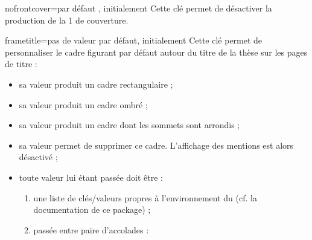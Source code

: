 \begin{docKey}{nofrontcover}{=\textbar{}}{par défaut
    , initialement }%
  Cette clé permet de désactiver la production de la 1\iere{} de couverture.
\end{docKey}

{%
\begin{docKey}{frametitle}{=\textbar{}\textbar{}\textbar{}\textbar{}}{pas de valeur par défaut, initialement }
  Cette clé permet de personnaliser le cadre figurant par défaut autour du
  titre de la thèse sur les pages de titre :
  \begin{itemize}
  \item sa valeur  produit un cadre rectangulaire ;
  \item sa valeur  produit un cadre ombré ;
  \item sa valeur  produit un cadre dont les sommets sont
    arrondis ;
  \item sa valeur  permet de supprimer ce cadre. L'affichage des
    mentions  est alors désactivé ;
  \item toute  valeur lui étant passée doit être :
    \begin{enumerate}
    \item une liste de clés/valeurs propres à l'environnement
       du  (cf. la
      documentation de ce package) ;
    \item passée entre paire d'accolades :
\begin{preamblecode}
\end{preamblecode}
    \end{enumerate}
  \end{itemize}
\end{docKey}
}

